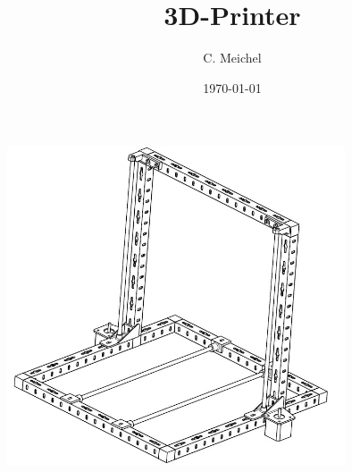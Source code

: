 \documentclass[a4paper,12pt]{article}%
\author{C. Meichel}%
\title{3D-Printer}%
\date{\today}%
\begin{document}
%
%
%
%
%
%
%
%
\maketitle%
\includegraphics[width=10cm]{img/frame.jpg}%
\clearpage%
\tableofcontents%
\clearpage%
%
%
%
%
%
\clearpage%
\listoffigures%
%
\end{document}
